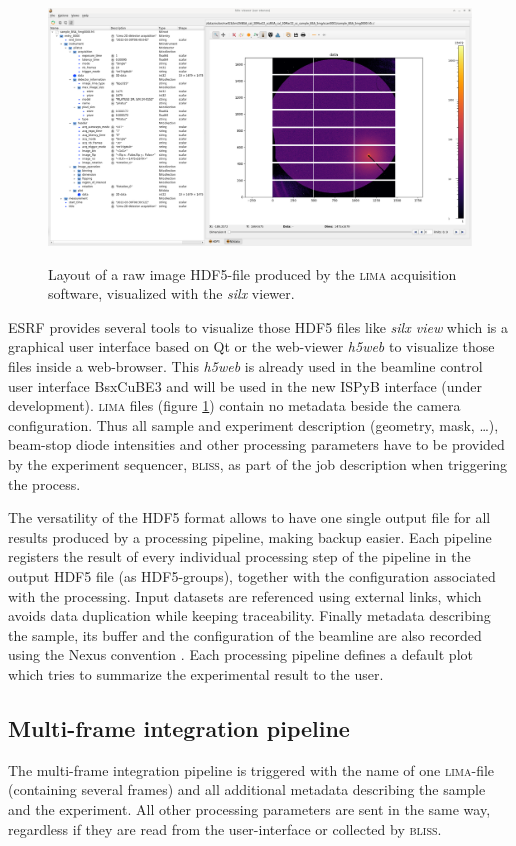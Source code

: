 \documentclass[preprint]{iucr}              %
\begin{document}
\begin{figure}
     \caption{Layout of a raw image HDF5-file produced by the \textsc{lima} acquisition software, visualized with the \textit{silx} viewer.}
     \includegraphics*[width=12cm]{lima.eps}
     \label{lima}
\end{figure}

ESRF provides several tools to visualize those HDF5 files like \textit{silx view} \cite{silx} which is a graphical user interface based on Qt \cite{pyqt} or the web-viewer \textit{h5web} \cite{h5web} to visualize those files inside a web-browser.
This \textit{h5web} is already used in the beamline control user interface BsxCuBE3 \cite{bm29_2022} and will be used in the new ISPyB interface (under development).
\textsc{lima} files (figure \ref{lima}) contain no metadata beside the camera configuration.
Thus all sample and experiment description (geometry, mask, \ldots), beam-stop diode intensities and other processing parameters have to be provided by the experiment sequencer, \textsc{bliss}, as part of the job description when triggering the process.

The versatility of the HDF5 format allows to have one single output file for all results produced by a processing pipeline, making backup easier.
Each pipeline registers the result of every individual processing step of the pipeline in the output HDF5 file (as HDF5-groups), together with the configuration associated with the processing.
Input datasets are referenced using external links, which avoids data duplication while keeping traceability. 
Finally metadata describing the sample, its buffer and the configuration of the beamline are also recorded using the Nexus convention \cite{nexus}.
Each processing pipeline defines a default plot which tries to summarize the experimental result to the user.

\subsection{Multi-frame integration pipeline}
\label{multiframe_pipeline}
The multi-frame integration pipeline is triggered with the name of one \textsc{lima}-file (containing several frames) and all additional metadata describing the sample and the experiment.
All other processing parameters are sent in the same way, regardless if they are read from the user-interface or collected by \textsc{bliss}.
\end{document}
